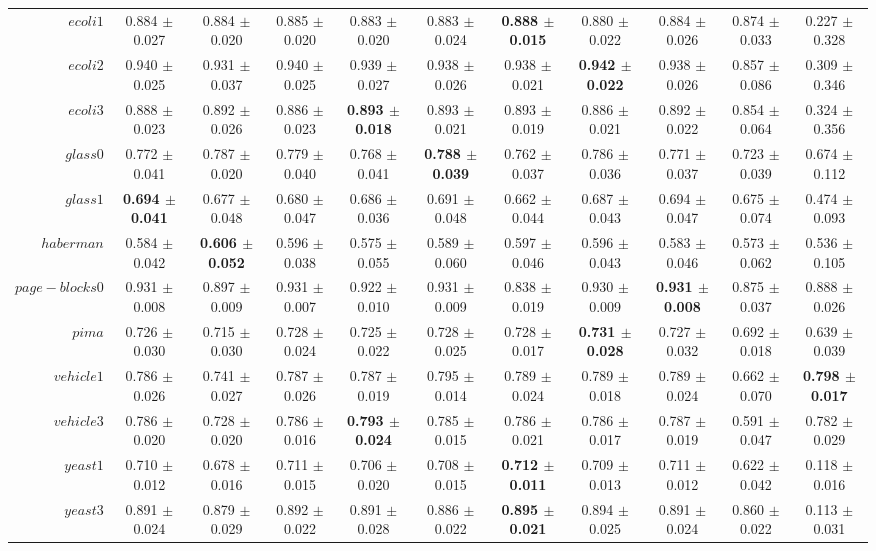 \begin{table}[!ht]
{\begin{tabular}{r c c c c c c c c c c}
$ecoli1$ & 0.884 $\pm$ 0.027 & 0.884 $\pm$ 0.020 & 0.885 $\pm$ 0.020 & 0.883 $\pm$ 0.020 & 0.883 $\pm$ 0.024 & \textbf{0.888 $\pm$ 0.015} & 0.880 $\pm$ 0.022 & 0.884 $\pm$ 0.026 & 0.874 $\pm$ 0.033 & 0.227 $\pm$ 0.328 \\
$ecoli2$ & 0.940 $\pm$ 0.025 & 0.931 $\pm$ 0.037 & 0.940 $\pm$ 0.025 & 0.939 $\pm$ 0.027 & 0.938 $\pm$ 0.026 & 0.938 $\pm$ 0.021 & \textbf{0.942 $\pm$ 0.022} & 0.938 $\pm$ 0.026 & 0.857 $\pm$ 0.086 & 0.309 $\pm$ 0.346 \\
$ecoli3$ & 0.888 $\pm$ 0.023 & 0.892 $\pm$ 0.026 & 0.886 $\pm$ 0.023 & \textbf{0.893 $\pm$ 0.018} & 0.893 $\pm$ 0.021 & 0.893 $\pm$ 0.019 & 0.886 $\pm$ 0.021 & 0.892 $\pm$ 0.022 & 0.854 $\pm$ 0.064 & 0.324 $\pm$ 0.356 \\
$glass0$ & 0.772 $\pm$ 0.041 & 0.787 $\pm$ 0.020 & 0.779 $\pm$ 0.040 & 0.768 $\pm$ 0.041 & \textbf{0.788 $\pm$ 0.039} & 0.762 $\pm$ 0.037 & 0.786 $\pm$ 0.036 & 0.771 $\pm$ 0.037 & 0.723 $\pm$ 0.039 & 0.674 $\pm$ 0.112 \\
$glass1$ & \textbf{0.694 $\pm$ 0.041} & 0.677 $\pm$ 0.048 & 0.680 $\pm$ 0.047 & 0.686 $\pm$ 0.036 & 0.691 $\pm$ 0.048 & 0.662 $\pm$ 0.044 & 0.687 $\pm$ 0.043 & 0.694 $\pm$ 0.047 & 0.675 $\pm$ 0.074 & 0.474 $\pm$ 0.093 \\
$haberman$ & 0.584 $\pm$ 0.042 & \textbf{0.606 $\pm$ 0.052} & 0.596 $\pm$ 0.038 & 0.575 $\pm$ 0.055 & 0.589 $\pm$ 0.060 & 0.597 $\pm$ 0.046 & 0.596 $\pm$ 0.043 & 0.583 $\pm$ 0.046 & 0.573 $\pm$ 0.062 & 0.536 $\pm$ 0.105 \\
$page-blocks0$ & 0.931 $\pm$ 0.008 & 0.897 $\pm$ 0.009 & 0.931 $\pm$ 0.007 & 0.922 $\pm$ 0.010 & 0.931 $\pm$ 0.009 & 0.838 $\pm$ 0.019 & 0.930 $\pm$ 0.009 & \textbf{0.931 $\pm$ 0.008} & 0.875 $\pm$ 0.037 & 0.888 $\pm$ 0.026 \\
$pima$ & 0.726 $\pm$ 0.030 & 0.715 $\pm$ 0.030 & 0.728 $\pm$ 0.024 & 0.725 $\pm$ 0.022 & 0.728 $\pm$ 0.025 & 0.728 $\pm$ 0.017 & \textbf{0.731 $\pm$ 0.028} & 0.727 $\pm$ 0.032 & 0.692 $\pm$ 0.018 & 0.639 $\pm$ 0.039 \\
$vehicle1$ & 0.786 $\pm$ 0.026 & 0.741 $\pm$ 0.027 & 0.787 $\pm$ 0.026 & 0.787 $\pm$ 0.019 & 0.795 $\pm$ 0.014 & 0.789 $\pm$ 0.024 & 0.789 $\pm$ 0.018 & 0.789 $\pm$ 0.024 & 0.662 $\pm$ 0.070 & \textbf{0.798 $\pm$ 0.017} \\
$vehicle3$ & 0.786 $\pm$ 0.020 & 0.728 $\pm$ 0.020 & 0.786 $\pm$ 0.016 & \textbf{0.793 $\pm$ 0.024} & 0.785 $\pm$ 0.015 & 0.786 $\pm$ 0.021 & 0.786 $\pm$ 0.017 & 0.787 $\pm$ 0.019 & 0.591 $\pm$ 0.047 & 0.782 $\pm$ 0.029 \\
$yeast1$ & 0.710 $\pm$ 0.012 & 0.678 $\pm$ 0.016 & 0.711 $\pm$ 0.015 & 0.706 $\pm$ 0.020 & 0.708 $\pm$ 0.015 & \textbf{0.712 $\pm$ 0.011} & 0.709 $\pm$ 0.013 & 0.711 $\pm$ 0.012 & 0.622 $\pm$ 0.042 & 0.118 $\pm$ 0.016 \\
$yeast3$ & 0.891 $\pm$ 0.024 & 0.879 $\pm$ 0.029 & 0.892 $\pm$ 0.022 & 0.891 $\pm$ 0.028 & 0.886 $\pm$ 0.022 & \textbf{0.895 $\pm$ 0.021} & 0.894 $\pm$ 0.025 & 0.891 $\pm$ 0.024 & 0.860 $\pm$ 0.022 & 0.113 $\pm$ 0.031 \\
\end{tabular}}
\end{table}
